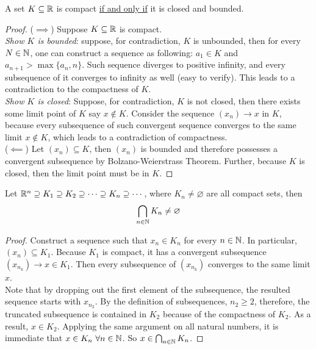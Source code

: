 \documentclass[11pt]{article}
\begin{document}
	\begin{theorem}
		A set $K \subseteq \mathbb{R}$ is compact \ul{if and only if} it is closed and bounded.
	\end{theorem}
	
	\begin{proof}
		($\implies$) Suppose $K \subseteq \mathbb{R}$ is compact. \\
		\emph{Show $K$ is bounded}: suppose, for contradiction, $K$ is unbounded, then for every $N \in \mathbb{N}$, one can construct a sequence as following: $a_1 \in K$ and $a_{n+1} > \max\{a_n, n\}$. Such sequence diverges to positive infinity, and every subsequence of it converges to infinity as well (easy to verify). This leads to a contradiction to the compactness of $K$. \\
		\emph{Show $K$ is closed}: Suppose, for contradiction, $K$ is not closed, then there exists some limit point of $K$ say $x \notin K$. Consider the sequence $(x_n) \to x$ in $K$, because every subsequence of such convergent sequence converges to the same limit $x \notin K$, which leads to a contradiction of compactness. \\
		($\impliedby$) Let $(x_n) \subseteq K$, then $(x_n)$ is bounded and therefore possesses a convergent subsequence by Bolzano-Weierstrass Theorem. Further, because $K$ is closed, then the limit point must be in $K$.
	\end{proof}
	
	\begin{theorem}
		Let $\mathbb{R}^n \supseteq K_1 \supseteq K_2 \supseteq \cdots \supseteq K_n \supseteq \cdots$, where $K_n \neq \varnothing$ are all compact sets, then
		\begin{align}
			\bigcap_{n \in \mathbb{N}} K_n \neq \varnothing
		\end{align}
	\end{theorem}
	
	\begin{proof}
		Construct a sequence such that $x_n \in K_n$ for every $n \in \mathbb{N}$. In particular, $(x_n) \subseteq K_1$. Because $K_1$ is compact, it has  a convergent subsequence $(x_{n_k}) \to x \in K_1$. Then every subsequence of $(x_{n_k})$ converges to the same limit $x$.
		\\Note that by dropping out the first element of the subsequence, the resulted sequence starts with $x_{n_2}$. By the definition of subsequences, $n_2 \geq 2$, therefore, the truncated subsequence is contained in $K_2$ because of the compactness of $K_2$. As a result, $x \in K_2$. Applying the same argument on all natural numbers, it is immediate that $x \in K_n\ \forall n \in \mathbb{N}$. So $x \in \bigcap_{n \in \mathbb{N}} K_n$.
	\end{proof}
	
\end{document}
